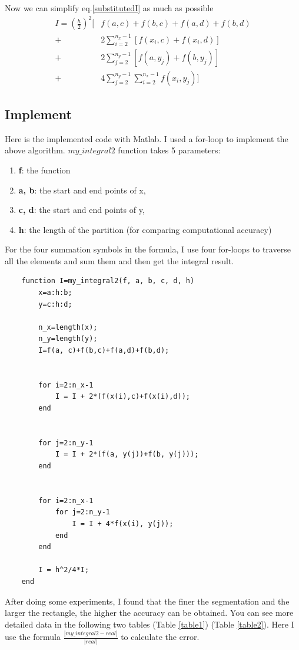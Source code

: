 \documentclass[
	12pt, %
]{fphw}
\numberwithin{equation}{section}
\numberwithin{figure}{section}
\numberwithin{table}{section}
\begin{document}
Now we can simplify eq.\eqref{substitutedI} as much as possible
\begin{equation}
	\begin{aligned}
		I = (\frac{h}{2})^2[ & f(a, c)+f(b, c)+f(a, d)+f(b, d)                   \\
		+                    & 2\sum^{n_x-1}_{i=2}[f(x_i, c)+f(x_i, d)]          \\
		+                    & 2\sum^{n_y-1}_{j=2}[f(a, y_j)+f(b, y_j)]          \\
		+                    & 4\sum^{n_y-1}_{j=2}\sum^{n_x-1}_{i=2}f(x_i, y_j)]
	\end{aligned}
\end{equation}


\subsection*{Implement}

Here is the implemented code with Matlab. 
I used a for-loop to implement the above algorithm. $my\_integral2$ function takes 5 parameters: 
\begin{enumerate}[itemindent=1em, label=•]
	\item \textbf{f}: the function
	\item \textbf{a, b}: the start and end points of x, 
	\item \textbf{c, d}: the start and end points of y, 
	\item \textbf{h}: the length of the partition (for comparing computational accuracy)
\end{enumerate}
For the four summation symbols in the formula, I use four for-loops to traverse all the elements and sum them and then get the integral result.

\begin{lstlisting}
	function I=my_integral2(f, a, b, c, d, h)
		x=a:h:b;
		y=c:h:d;

		n_x=length(x);
		n_y=length(y);
		I=f(a, c)+f(b,c)+f(a,d)+f(b,d);


		for i=2:n_x-1
			I = I + 2*(f(x(i),c)+f(x(i),d));
		end


		for j=2:n_y-1
			I = I + 2*(f(a, y(j))+f(b, y(j)));
		end

		
		for i=2:n_x-1
			for j=2:n_y-1
				I = I + 4*f(x(i), y(j));
			end
		end

		I = h^2/4*I;
	end
\end{lstlisting}

After doing some experiments, I found that the finer the segmentation and the larger the rectangle, the higher the accuracy can be obtained. You can see more detailed data in the following two tables (Table \ref{table1}) (Table \ref{table2}).
Here I use the formula $\frac{\left\lvert my\_integral2-real\right\rvert }{\left\lvert real\right\rvert }$ to calculate the error.
\end{document}
